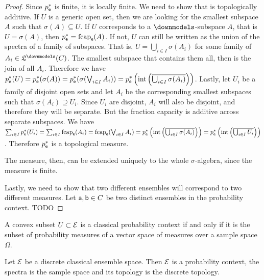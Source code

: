 \begin{mathSection}
\begin{proof}
	Since $p^*_{\ens}$ is finite, it is locally finite. We need to show that is topologically additive. If $U$ is a generic open set, then we are looking for the smallest subspace $A$ such that $\sigma(A) \subseteq U$. If $U$ corresponds to a $\separate$-subspace $A$, that is $U = \sigma(A)$, then $p^*_{\ens} = \fcap_{\ens}(A)$. If not, $U$ can still be written as the union of the spectra of a family of subspaces. That is, $U = \bigcup_{i \in I} \sigma(A_i)$ for some family of $A_i \in \mathfrak{L}^\separate(C)$. The smallest subspace that contains them all, then is the join of all $A_i$. Therefore we have $p^*_{\ens}(U) = p^*_{\ens}(\sigma(A)) = p^*_{\ens}(\sigma(\bigvee_{i \in I} A_i)) = p^*_{\ens}\left(\interior\left(\overline{\bigcup_{i \in I} \sigma(A_i)}\right)\right)$. Lastly, let $U_i$ be a family of disjoint open sets and let $A_i$ be the corresponding smallest subspaces such that $\sigma(A_i) \supseteq U_i$. Since $U_i$ are disjoint, $A_i$ will also be disjoint, and therefore they will be separate. But the fraction capacity is additive across separate subspaces. We have $\sum_{i \in I} p^*_{\ens}(U_i) = \sum_{i \in I} \fcap_{\ens}(A_i) = \fcap_{\ens}(\bigvee_{i \in I} A_i) = p^*_{\ens}\left(\interior\left(\overline{\bigcup_{i \in I} \sigma(A_i)}\right)\right) = p^*_{\ens}\left(\interior\left(\overline{\bigcup_{i \in I} U_i}\right)\right)$. Therefore $p^*_{\ens}$ is a topological measure.
	
	The measure, then, can be extended uniquely to the whole $\sigma$-algebra, since the measure is finite.
	
	Lastly, we need to show that two different ensembles will correspond to two different measures. Let $\ens[a],\ens[b] \in C$ be two distinct ensembles in the probability context. TODO
\end{proof}
\end{mathSection}

\begin{conj}
	A convex subset $U \subset \Ens$ is a classical probability context if and only if it is the subset of probability measures of a vector space of measures over a sample space $\Omega$.
\end{conj}

\begin{prop}
	Let $\Ens$ be a discrete classical ensemble space. Then $\Ens$ is a probability context, the spectra is the sample space and its topology is the discrete topology.
\end{prop}

